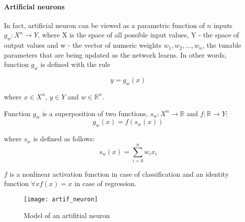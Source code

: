 \paragraph{Artificial neurons} 

In fact, artificial neuron can be viewed as a parametric function of $ n $ inputs $ g_{w}:X^{n} \rightarrow Y $, where X is the space of all possible input values, Y - the space of output values and w - the vector of numeric weights $ w_{1}, w_{2}, ..., w_{n} $, the tunable parameters that are being updated as the network learns. In other words, function $ g_{w} $ is defined with the rule

\begin{equation}
  y = g_{w}(x)
\end{equation}

where $ x \in X^{n} $, $ y \in Y $ and $ w \in \mathbb{R}^{n} $.

Function $ g_{w} $ is a superposition of two functions, $ s_{w}:X^{n} \rightarrow \mathbb{R} $ and $ f:\mathbb{R} \rightarrow Y $:
\[ g_{w}(x) = f(s_{w}(x)) \]

where $ s_{w} $ is defined as follows:
\[ s_{w}(x) = \sum_{i=0}^{n} w_{i}x_{i} \]

$ f $ is a nonlinear activation function in case of classification and an identity function $ \forall x f(x) = x $ in case of regression.

\begin{figure}[H]
  \centering
  \texttt{[image: artif\_neuron]}
  \caption[Model of an artifitial neuron]{Model of an artifitial neuron\footnotemark}
  \label{fig:artifneuron}
\end{figure}


%

